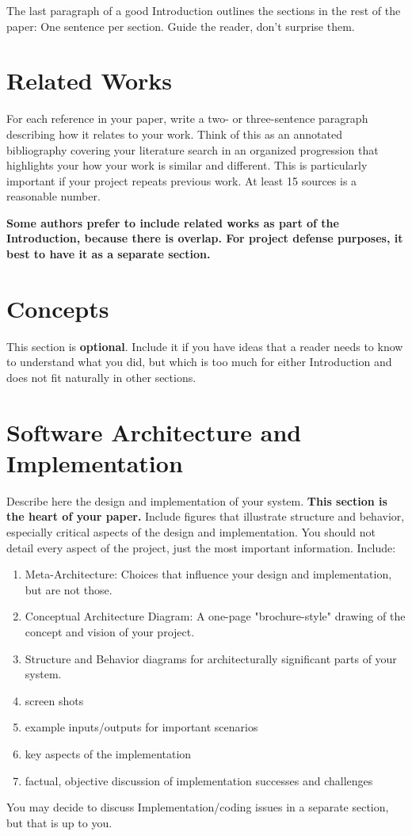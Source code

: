 \documentclass[acmlarge,screen]{acmart}
\begin{document}
The last paragraph of a good Introduction outlines the sections in the
rest of the paper: One sentence per section. Guide the reader, don't surprise them.

\section{Related Works}
For each reference in your paper, write a two- or three-sentence paragraph 
describing how it relates to your work. Think of this as an annotated bibliography
covering your literature search in an organized progression that highlights your 
how your work is similar and different. This is particularly important if your project repeats
previous work. At least 15 sources is a reasonable number.

\textbf{Some authors prefer to include related works as part of the Introduction, because there
is overlap. For project defense purposes, it best to have it as a separate section.}

\section{Concepts}
This section is \textbf{optional}. Include it if you have ideas that a reader needs to know to
understand what you did, but which is too much for either Introduction and does not
fit naturally in other sections.

\section{Software Architecture and Implementation}
Describe here the design and implementation of your system. \textbf{This section is the heart of your paper.} Include figures that illustrate structure and behavior, especially critical aspects of the design and implementation. You should not detail every aspect of the project, just the most important information. Include:
\begin{enumerate}
    \item Meta-Architecture: Choices that influence your design and implementation, but are not those.
    \item Conceptual Architecture Diagram: A one-page "brochure-style" drawing of the concept and vision of your project.
    \item Structure and Behavior diagrams for architecturally significant parts of your system.
    \item screen shots
    \item example inputs/outputs for important scenarios
    \item key aspects of the implementation
    \item factual, objective discussion of implementation successes and challenges
\end{enumerate}
You may decide to discuss Implementation/coding issues in a separate section, but that is up to you.
\end{document}
